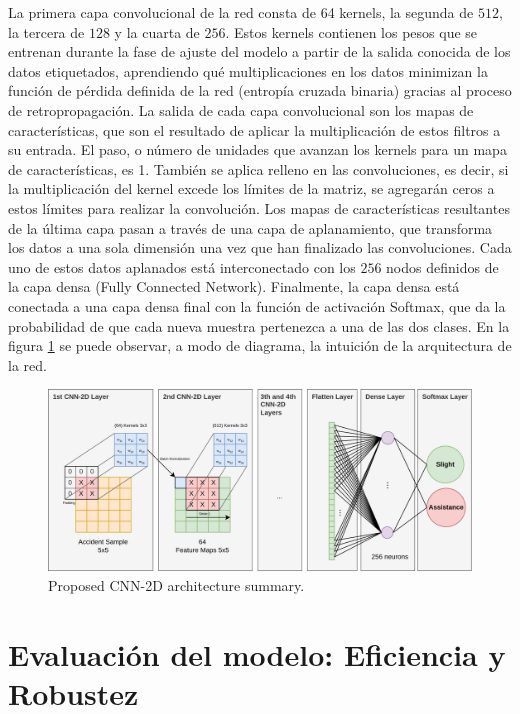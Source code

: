 \documentclass{uathesis-es}
\begin{document}
La primera capa convolucional de la red consta de 64 kernels, la segunda de $512$, la tercera de $128$ y la cuarta de $256$. Estos kernels contienen los pesos que se entrenan durante la fase de ajuste del modelo a partir de la salida conocida de los datos etiquetados, aprendiendo qué multiplicaciones en los datos minimizan la función de pérdida definida de la red (entropía cruzada binaria) gracias al proceso de retropropagación. La salida de cada capa convolucional son los mapas de características, que son el resultado de aplicar la multiplicación de estos filtros a su entrada. El paso, o número de unidades que avanzan los kernels para un mapa de características, es 1. También se aplica relleno en las convoluciones, es decir, si la multiplicación del kernel excede los límites de la matriz, se agregarán ceros a estos límites para realizar la convolución. Los mapas de características resultantes de la última capa pasan a través de una capa de aplanamiento, que transforma los datos a una sola dimensión una vez que han finalizado las convoluciones. Cada uno de estos datos aplanados está interconectado con los $256$ nodos definidos de la capa densa (Fully Connected Network). Finalmente, la capa densa está conectada a una capa densa final con la función de activación Softmax, que da la probabilidad de que cada nueva muestra pertenezca a una de las dos clases. En la figura \ref{CNN2DArchitecture} se puede observar, a modo de diagrama, la intuición de la arquitectura de la red.


\begin{figure}[H]
    \centering
    \includegraphics[width=15cm]{Figures/SIMPLE.png}
    \caption{Proposed CNN-2D architecture summary.}
    \label{CNN2DArchitecture}
\end{figure}

\section{Evaluación del modelo: Eficiencia y Robustez}
\end{document}
